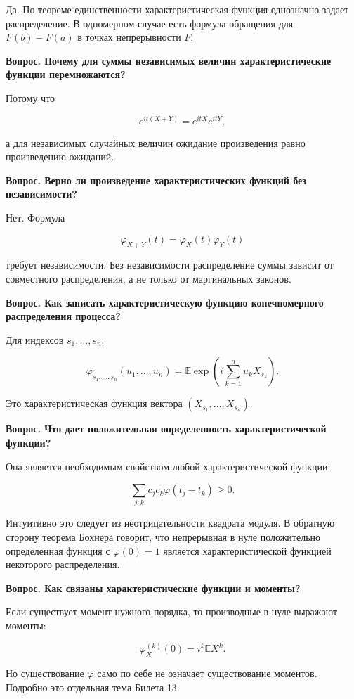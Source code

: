 \documentclass[
  11pt,
  a4paper,
]{article}
\begin{document}
Да. По теореме единственности характеристическая функция однозначно
задает распределение. В одномерном случае есть формула обращения для
\(F(b)-F(a)\) в точках непрерывности \(F\).

\textbf{Вопрос. Почему для суммы независимых величин характеристические
функции перемножаются?}

Потому что

\[
e^{it(X+Y)}=e^{itX}e^{itY},
\]

а для независимых случайных величин ожидание произведения равно
произведению ожиданий.

\textbf{Вопрос. Верно ли произведение характеристических функций без
независимости?}

Нет. Формула

\[
\varphi_{X+Y}(t)=\varphi_X(t)\varphi_Y(t)
\]

требует независимости. Без независимости распределение суммы зависит от
совместного распределения, а не только от маргинальных законов.

\textbf{Вопрос. Как записать характеристическую функцию конечномерного
распределения процесса?}

Для индексов \(s_1,\ldots,s_n\):

\[
\varphi_{s_1,\ldots,s_n}(u_1,\ldots,u_n)
=
\mathbb E\exp\left(i\sum_{k=1}^n u_kX_{s_k}\right).
\]

Это характеристическая функция вектора \((X_{s_1},\ldots,X_{s_n})\).

\textbf{Вопрос. Что дает положительная определенность характеристической
функции?}

Она является необходимым свойством любой характеристической функции:

\[
\sum_{j,k}c_j\overline{c_k}\varphi(t_j-t_k)\ge0.
\]

Интуитивно это следует из неотрицательности квадрата модуля. В обратную
сторону теорема Бохнера говорит, что непрерывная в нуле положительно
определенная функция с \(\varphi(0)=1\) является характеристической
функцией некоторого распределения.

\textbf{Вопрос. Как связаны характеристические функции и моменты?}

Если существует момент нужного порядка, то производные в нуле выражают
моменты:

\[
\varphi_X^{(k)}(0)=i^k\mathbb E X^k.
\]

Но существование \(\varphi\) само по себе не означает существование
моментов. Подробно это отдельная тема Билета 13.
\end{document}
